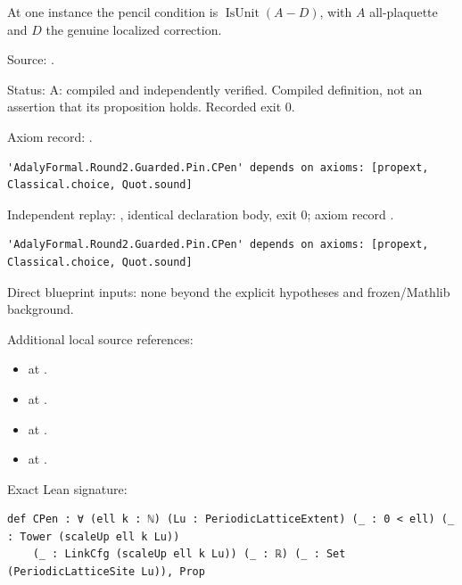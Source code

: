 \begin{definition}[bp-005]
\label{bp-005}
\uses{}
\leanok
At one instance the pencil condition is \(\operatorname{IsUnit}(A-D)\), with \(A\) all-plaquette and \(D\) the genuine localized correction.

\par Source: \texttt{}.
\par Status: A: compiled and independently verified. Compiled definition, not an assertion that its proposition holds. Recorded exit 0.
\par Axiom record: \texttt{}.
\begin{verbatim}
'AdalyFormal.Round2.Guarded.Pin.CPen' depends on axioms: [propext, Classical.choice, Quot.sound]
\end{verbatim}
\par Independent replay: \texttt{}, identical declaration body, exit 0; axiom record \texttt{}.
\begin{verbatim}
'AdalyFormal.Round2.Guarded.Pin.CPen' depends on axioms: [propext, Classical.choice, Quot.sound]
\end{verbatim}
\par Direct blueprint inputs: none beyond the explicit hypotheses and frozen/Mathlib background.
\par Additional local source references:
\begin{itemize}
\item \texttt{} at \texttt{}.
\item \texttt{} at \texttt{}.
\item \texttt{} at \texttt{}.
\item \texttt{} at \texttt{}.
\end{itemize}
\par Exact Lean signature:
\begin{verbatim}
def CPen : ∀ (ell k : ℕ) (Lu : PeriodicLatticeExtent) (_ : 0 < ell) (_ : Tower (scaleUp ell k Lu))
    (_ : LinkCfg (scaleUp ell k Lu)) (_ : ℝ) (_ : Set (PeriodicLatticeSite Lu)), Prop
\end{verbatim}
\end{definition}

